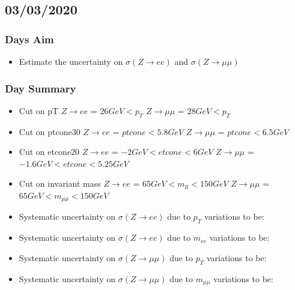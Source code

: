 \subsection*{\textbf{03/03/2020}}
\subsubsection{Days Aim}
\begin{itemize}
    \item Estimate the uncertainty on $\sigma (Z \rightarrow ee)$ and $\sigma (Z \rightarrow \mu\mu)$
\end{itemize}
\subsubsection{Day Summary}
\begin{itemize}
    \item Cut on pT
    \subitem $Z \rightarrow ee$ = $26 GeV < p_T$
    \subitem $Z \rightarrow \mu\mu$ = $28 GeV < p_T$

    \item Cut on ptcone30
    \subitem $Z \rightarrow ee$ = $ ptcone < 5.8 GeV$
    \subitem $Z \rightarrow \mu\mu$ = $ ptcone < 6.5 GeV$

    \item Cut on etcone20
    \subitem $Z \rightarrow ee$ = $ -2 GeV < etcone < 6 GeV$
    \subitem $Z \rightarrow \mu\mu$ = $ -1.6 GeV < etcone < 5.25 GeV$

    \item Cut on invariant mass
    \subitem $Z \rightarrow ee$ = $65 GeV < m_{ll} < 150 GeV$
    \subitem $Z \rightarrow \mu\mu$ = $65 GeV < m_{\mu\mu} < 150 GeV$
    
    \item Systematic uncertainty on $\sigma (Z \rightarrow ee)$ due to $p_T$ variations to be: 
    \subitem
    
    \item Systematic uncertainty on $\sigma (Z \rightarrow ee)$ due to $m_{ee}$ variations to be: 
    \subitem
    
    \item Systematic uncertainty on $\sigma (Z \rightarrow \mu\mu)$ due to $p_T$ variations to be: 
    \subitem
    
    \item Systematic uncertainty on $\sigma (Z \rightarrow \mu\mu)$ due to $m_{\mu\mu}$ variations to be: 
    \subitem
\end{itemize}
